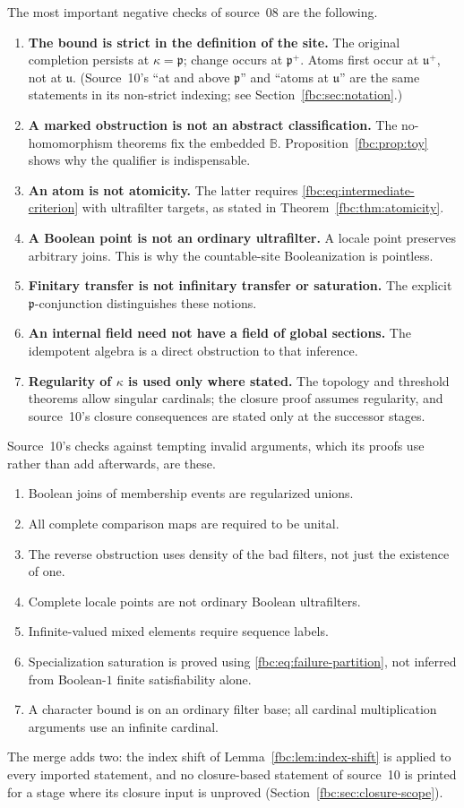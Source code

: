 \documentclass[11pt,letterpaper]{article}
\theoremstyle{definition}
\theoremstyle{remark}
\newcommand{\B}{\mathbb B}
\newcommand{\cp}{\mathfrak p}
\newcommand{\cu}{\mathfrak u}
\begin{document}
The most important negative checks of source~08 are the following.
\begin{enumerate}[label=\textup{A\arabic*.},leftmargin=2.8em]
\item \textbf{The bound is strict in the definition of the site.}
The original completion persists at $\kappa=\cp$; change occurs
at $\cp^+$. Atoms first occur at $\cu^+$, not at $\cu$. (Source~10's
``at and above $\cp$'' and ``atoms at $\cu$'' are the same statements in
its non-strict indexing; see Section~\ref{fbc:sec:notation}.)
\item \textbf{A marked obstruction is not an abstract classification.}
The no-homomorphism theorems fix the embedded $\B$.
Proposition~\ref{fbc:prop:toy} shows why the qualifier is indispensable.
\item \textbf{An atom is not atomicity.}
The latter requires \eqref{fbc:eq:intermediate-criterion} with
ultrafilter targets, as stated in Theorem~\ref{fbc:thm:atomicity}.
\item \textbf{A Boolean point is not an ordinary ultrafilter.}
A locale point preserves arbitrary joins. This is why the
countable-site Booleanization is pointless.
\item \textbf{Finitary transfer is not infinitary transfer or saturation.}
The explicit $\cp$-conjunction distinguishes these notions.
\item \textbf{An internal field need not have a field of global sections.}
The idempotent algebra is a direct obstruction to that inference.
\item \textbf{Regularity of $\kappa$ is used only where stated.}
The topology and threshold theorems allow singular cardinals;
the closure proof assumes regularity, and source~10's closure
consequences are stated only at the successor stages.
\end{enumerate}
Source~10's checks against tempting invalid arguments, which its proofs
use rather than add afterwards, are these.
\begin{enumerate}[label=\textup{B\arabic*.},leftmargin=2.8em]
\item Boolean joins of membership events are regularized unions.
\item All complete comparison maps are required to be unital.
\item The reverse obstruction uses density of the bad filters, not just
the existence of one.
\item Complete locale points are not ordinary Boolean ultrafilters.
\item Infinite-valued mixed elements require sequence labels.
\item Specialization saturation is proved using
\eqref{fbc:eq:failure-partition}, not inferred from Boolean-$1$ finite
satisfiability alone.
\item A character bound is on an ordinary filter base; all cardinal
multiplication arguments use an infinite cardinal.
\end{enumerate}
The merge adds two: the index shift of Lemma~\ref{fbc:lem:index-shift}
is applied to every imported statement, and no closure-based statement of
source~10 is printed for a stage where its closure input is unproved
(Section~\ref{fbc:sec:closure-scope}).
\end{document}
